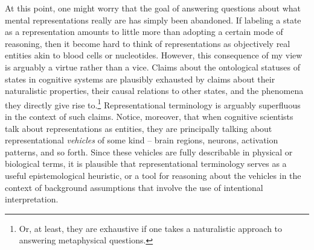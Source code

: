 At this point, one might worry that the goal of answering questions about what mental representations really are has simply been abandoned. If labeling a state as a representation amounts to little more than adopting a certain mode of reasoning, then it become hard to think of representations as objectively real entities akin to blood cells or nucleotides. However, this consequence of my view is arguably a virtue rather than a vice. Claims about the ontological statuses of states in cognitive systems are plausibly exhausted by claims about their naturalistic properties, their causal relations to other states, and the phenomena they directly give rise to.\footnote{Or, at least, they are exhaustive if one takes a naturalistic approach to answering metaphysical questions.} Representational terminology is arguably superfluous in the context of such claims. Notice, moreover, that when cognitive scientists talk about representations as entities, they are principally talking about representational \textit{vehicles} of some kind -- brain regions, neurons, activation patterns, and so forth. Since these vehicles are fully describable in physical or biological terms, it is plausible that representational terminology serves as a useful epistemological heuristic, or a tool for reasoning about the vehicles in the context of background assumptions that involve the use of intentional interpretation. 

